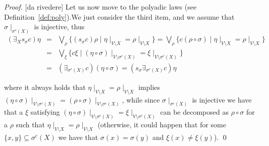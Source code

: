 \documentclass{llncs}
\newcommand{\comment}[1]{}
\def\monop{\otimes}
\begin{document}
{\begin{proof}

[da rivedere]
Let us now move to the polyadic laws (see Definition~\ref{def:poly}).We just consider the third item, 
and we assume that $\sigma \mid_{\sigma^c(X)}$ is injective, thus
\begin{eqnarray*}
(\exists_X s_\sigma c) \eta & = &\bigvee_\rho \{(s_\sigma c) \rho \mid \eta\mid_{V \setminus X} = \rho\mid_{V \setminus X}\} = \bigvee_\rho \{c (\rho \circ \sigma) \mid \eta\mid_{V \setminus X} =   \rho\mid_{V \setminus X}\} \\ 
& = & \bigvee_\xi \{c\xi \mid (\eta \circ \sigma)\mid_{V \setminus \sigma^{c}(X)}  =  \xi\mid_{V \setminus \sigma^{c}(X)}\} \\
& = & (\exists_{\sigma^c(X)} c) (\eta \circ \sigma) = (s_\sigma \exists_{\sigma^c(X)} c) \eta
\end{eqnarray*}

\noindent
where it always holds that $\eta\mid_{V \setminus X} = \rho\mid_{V \setminus X}$ implies $(\eta\circ \sigma)\mid_{V \setminus \sigma^{c}(X)} = (\rho\circ \sigma)\mid_{V \setminus \sigma^{c}(X)}$,
while since $\sigma \mid_{\sigma^c(X)}$ is injective we have that
a $\xi$ satisfying $(\eta \circ \sigma)\mid_{V \setminus \sigma^{c}(X)} = \xi\mid_{V \setminus \sigma^{c}(X)}$ can be decomposed as $\rho\circ \sigma$
for a $\rho$ such that $\eta\mid_{V \setminus X} = \rho\mid_{V \setminus X}$
(otherwise, it could happen that for some $\{x, y\} \subseteq \sigma^c(X)$ we have that $\sigma(x) =\sigma(y)$ and 
$\xi(x) \neq \xi(y)$).
\qed
\end{proof}
}
%


\comment{
Note also that the diagonal elements are not guaranteed to be $\monop$-compact,
even if they have finite support, since $\top$ is not necessarily so.
%
To this end, we close the section by adding the simple result below to the soft constraint lore.

\begin{proposition}
	Let $c \in \mathbb{C}$ be a constraint. It is $\monop$-compact if and only if it has finite support and 
	$c\eta$ is $\monop$-compact for all $\eta$.
\end{proposition}
}
\end{document}
